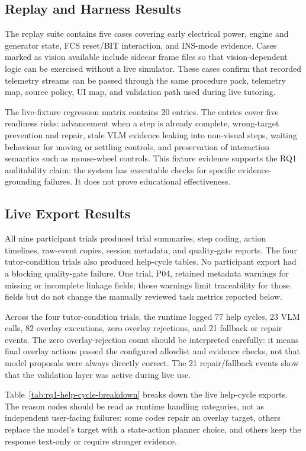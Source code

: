 \subsection{Replay and Harness Results}

The replay suite contains five cases covering early electrical power, engine
and generator state, FCS reset/BIT interaction, and INS-mode evidence. Cases
marked as vision available include sidecar frame files so that vision-dependent
logic can be exercised without a live simulator. These cases confirm that
recorded telemetry streams can be passed through the same procedure pack,
telemetry map, source policy, UI map, and validation path used during live
tutoring.

The live-fixture regression matrix contains 20 entries. The entries cover five
readiness risks: advancement when a step is already complete, wrong-target
prevention and repair, stale VLM evidence leaking into non-visual steps,
waiting behaviour for moving or settling controls, and preservation of
interaction semantics such as mouse-wheel controls. This fixture evidence
supports the RQ1 auditability claim: the system has executable checks for
specific evidence-grounding failures. It does not prove educational
effectiveness.

\subsection{Live Export Results}

All nine participant trials produced trial summaries, step coding, action
timelines, raw-event copies, session metadata, and quality-gate reports. The
four tutor-condition trials also produced help-cycle tables. No participant
export had a blocking quality-gate failure. One trial, P04, retained metadata
warnings for missing or incomplete linkage fields; those warnings limit
traceability for those fields but do not change the manually reviewed task
metrics reported below.

Across the four tutor-condition trials, the runtime logged 77 help cycles, 23
VLM calls, 82 overlay executions, zero overlay rejections, and 21 fallback or
repair events. The zero overlay-rejection count should be interpreted
carefully: it means final overlay actions passed the configured allowlist and
evidence checks, not that model proposals were always directly correct. The 21
repair/fallback events show that the validation layer was active during live
use.

Table~\ref{tab:rq1-help-cycle-breakdown} breaks down the live help-cycle
exports. The reason codes should be read as runtime handling categories, not
as independent user-facing failures: some codes repair an overlay target,
others replace the model's target with a state-action planner choice, and
others keep the response text-only or require stronger evidence.

